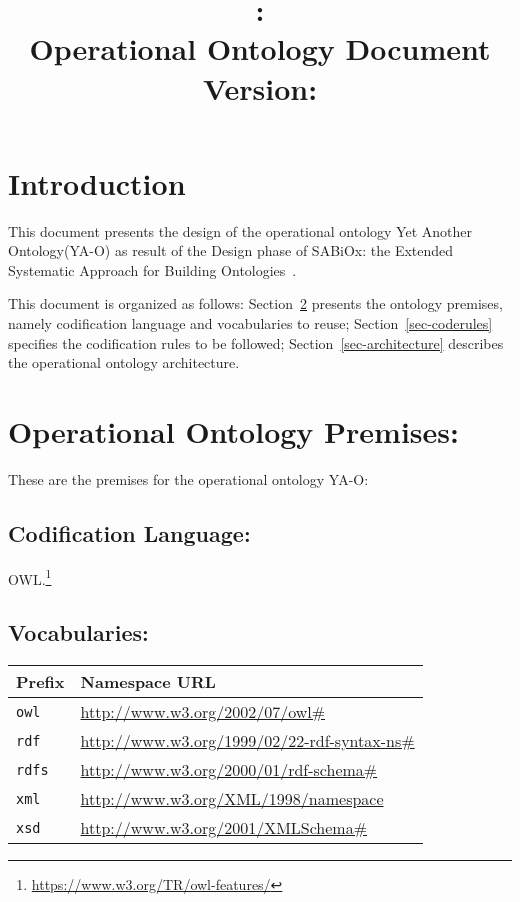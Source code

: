 \documentclass[table,usenames,dvipsnames]{article}
\title{\ontologyacronym: \ontologyname
	\\{\large Operational Ontology Document}
	\\{\normalsize Version: \documentversion}}
\author{\authorname}
\newcommand{\sabiox}{SABiOx\xspace}
\newcommand{\sabioxfull}{Extended Systematic Approach for Building Ontologies\xspace}
\newcommand{\ontologyacronym}{YA-O\xspace}
\newcommand{\ontologyname}{Yet Another Ontology\xspace}
\begin{document}
\maketitle


\section{Introduction}

This document presents the design of the operational ontology \ontologyname (\ontologyacronym) as result of the Design phase of \sabiox: the \sabioxfull~\cite{aguiar-souza:report24}.

This document is organized as follows:
	Section~\ref{sec-premises} presents the ontology premises, namely codification language and vocabularies to reuse;
	Section~\ref{sec-coderules} specifies the codification rules to be followed;
	Section~\ref{sec-architecture} describes the operational ontology architecture.


\section{Operational Ontology Premises:}
\label{sec-premises}

These are the premises for the operational ontology \ontologyacronym:


\subsection{Codification Language:}
\label{sec-premises-language}

OWL.\footnote{\url{https://www.w3.org/TR/owl-features/}}



\subsection{Vocabularies:}
\label{sec-premises-vocabularies}

\begin{center}
	\begin{small}
		\begin{longtable}{ p{20mm} p{140mm} }
			\hline
			\textbf{Prefix} & \textbf{Namespace URL} \\\hline
			
			\texttt{owl}  & \url{http://www.w3.org/2002/07/owl#} \\\hline
			\texttt{rdf}  & \url{http://www.w3.org/1999/02/22-rdf-syntax-ns#} \\\hline
			\texttt{rdfs} & \url{http://www.w3.org/2000/01/rdf-schema#} \\\hline
			\texttt{xml}  & \url{http://www.w3.org/XML/1998/namespace} \\\hline
			\texttt{xsd}  & \url{http://www.w3.org/2001/XMLSchema#} \\\hline
		\end{longtable}
	\end{small}
\end{center}
\end{document}
